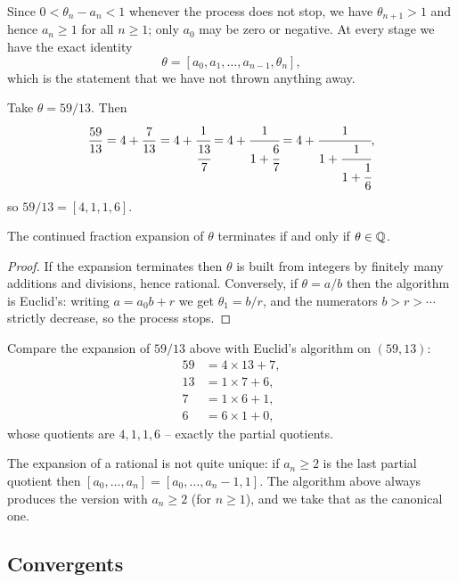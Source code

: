 \documentclass[a4paper]{scrartcl}
\begin{document}
Since $0 < \theta_n - a_n < 1$ whenever the process does not stop, we have $\theta_{n+1} > 1$ and hence $a_n \geq 1$ for all $n \geq 1$; only $a_0$ may be zero or negative. At every stage we have the exact identity
$$
\theta = [a_0, a_1, \dots, a_{n-1}, \theta_n],
$$
which is the statement that we have not thrown anything away.

\begin{example}
	Take $\theta = 59/13$. Then
	$$
	\frac{59}{13} = 4 + \frac7{13} = 4 + \cfrac1{\cfrac{13}7} = 4 + \cfrac1{1 + \cfrac67} = 4 + \cfrac1{1 + \cfrac1{1 + \cfrac16}},
	$$
	so $59/13 = [4, 1, 1, 6]$.
\end{example}

\begin{proposition}
	The continued fraction expansion of $\theta$ terminates if and only if $\theta \in \mathbb{Q}$.
\end{proposition}
\begin{proof}
	If the expansion terminates then $\theta$ is built from integers by finitely many additions and divisions, hence rational. Conversely, if $\theta = a/b$ then the algorithm is Euclid's: writing $a = a_0 b + r$ we get $\theta_1 = b/r$, and the numerators $b > r > \cdots$ strictly decrease, so the process stops.
\end{proof}

\begin{example}
	Compare the expansion of $59/13$ above with Euclid's algorithm on $(59, 13)$:
	\begin{align*}
		59 &= 4\times13 + 7, \\
		13 &= 1 \times 7 + 6, \\
		7 &= 1\times 6 + 1, \\
		6 &= 6\times 1 + 0,
	\end{align*}
	whose quotients are $4, 1, 1, 6$ -- exactly the partial quotients.
\end{example}

\begin{remark}
	The expansion of a rational is not quite unique: if $a_n \geq 2$ is the last partial quotient then $[a_0, \dots, a_n] = [a_0, \dots, a_n - 1, 1]$. The algorithm above always produces the version with $a_n \geq 2$ (for $n \geq 1$), and we take that as the canonical one.
\end{remark}

\subsection{Convergents}
\end{document}
